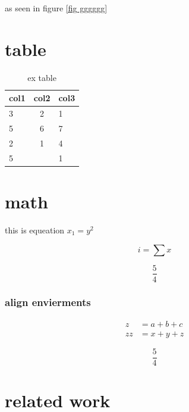 \documentclass[a4paper,twocolumn]{article}
\begin{document}
as seen in figure \ref{fig gggggg}


\lipsum
\section{table}
\lipsum
\begin{table}
	\centering
	\resizebox{0.5\textwidth}{!} {
	\begin{tabular} {l|cl}
		\hline
		col1 & col2 & col3 \\ \hline
		3 & 2 & 1 \\ \hline
		5 & 6 & 7 \\ \hline
		2 & 1 & 4 \\ \hline
		5 &  & 1 \\ \hline		
	\end{tabular}
}
\caption{ex table}
\end{table}

\section{math}
this is equeation $x_1 = y^2$ 

\begin{equation}
	i = \sum x
\end{equation}

\begin{equation}
	\frac{5}{4}
\end{equation}

\lipsum[1]

\subsubsection{align envierments}



\begin{align}
	z &= a + b + c \\
	\nonumber 
	zz &= x + y + z
\end{align}

\begin{equation}
	\frac{5}{4}
\end{equation}

\section{related work}



  
\end{document}
